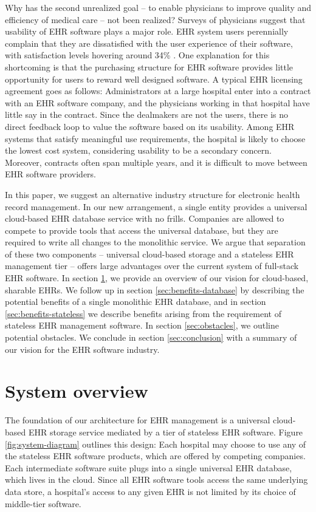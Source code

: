 Why has the second unrealized goal -- to enable physicians to improve quality and efficiency of medical care -- not been realized? Surveys of physicians suggest that usability of EHR software plays a major role. EHR system users perennially complain that they are dissatisfied with the user experience of their software, with satisfaction levels hovering around 34\% \cite{EHR-Satisfaction}. One explanation for this shortcoming is that the purchasing structure for EHR software provides little opportunity for users to reward well designed software. A typical EHR licensing agreement goes as follows: Administrators at a large hospital enter into a contract with an EHR software company, and the physicians working in that hospital have little say in the contract. Since the dealmakers are not the users, there is no direct feedback loop to value the software based on its usability. Among EHR systems that satisfy meaningful use requirements, the hospital is likely to choose the lowest cost system, considering usability to be a secondary concern. Moreover, contracts often span multiple years, and it is difficult to move between EHR software providers.

In this paper, we suggest an alternative industry structure for electronic health record management. In our new arrangement, a single entity provides a universal cloud-based EHR database service with no frills. Companies are allowed to compete to provide tools that access the universal database, but they are required to write all changes to the monolithic service. We argue that separation of these two components -- universal cloud-based storage and a stateless EHR management tier -- offers large advantages over the current system of full-stack EHR software. In section \ref{sec:overview}, we provide an overview of our vision for cloud-based, sharable EHRs. We follow up in section \ref{sec:benefits-database} by describing the potential benefits of a single monolithic EHR database, and in section \ref{sec:benefits-stateless} we describe benefits arising from the requirement of stateless EHR management software. In section \ref{sec:obstacles}, we outline potential obstacles. We conclude in section \ref{sec:conclusion} with a summary of our vision for the EHR software industry.

\section{System overview}\label{sec:overview}
The foundation of our architecture for EHR management is a universal cloud-based EHR storage service mediated by a tier of stateless EHR software. Figure \ref{fig:system-diagram} outlines this design: Each hospital may choose to use any of the stateless EHR software products, which are offered by competing companies. Each intermediate software suite plugs into a single universal EHR database, which lives in the cloud. Since all EHR software tools access the same underlying data store, a hospital's access to any given EHR is not limited by its choice of middle-tier software.

